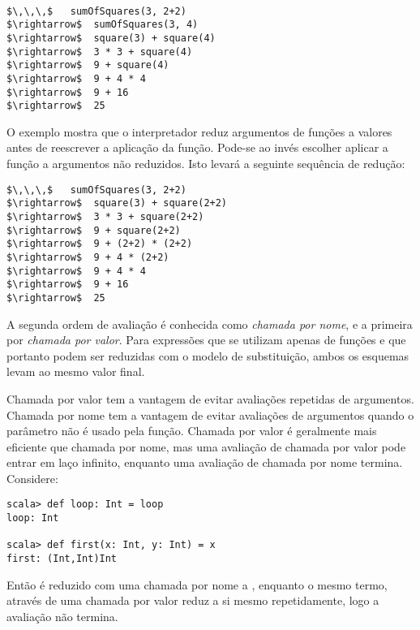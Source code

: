 \example\ 
 
\begin{lstlisting}
$\,\,\,$   sumOfSquares(3, 2+2)
$\rightarrow$  sumOfSquares(3, 4)
$\rightarrow$  square(3) + square(4)
$\rightarrow$  3 * 3 + square(4)
$\rightarrow$  9 + square(4)
$\rightarrow$  9 + 4 * 4
$\rightarrow$  9 + 16
$\rightarrow$  25
\end{lstlisting}

O exemplo mostra que o interpretador reduz argumentos de fun\c{c}\~{o}es a valores 
antes de reescrever a aplica\c{c}\~{a}o da fun\c{c}\~{a}o. Pode-se ao inv\'{e}s escolher aplicar
a fun\c{c}\~{a}o a argumentos n\~{a}o reduzidos. Isto levar\'{a} a seguinte sequ\^{e}ncia de 
redu\c{c}\~{a}o: 

\begin{lstlisting}
$\,\,\,$   sumOfSquares(3, 2+2)
$\rightarrow$  square(3) + square(2+2)
$\rightarrow$  3 * 3 + square(2+2)
$\rightarrow$  9 + square(2+2)
$\rightarrow$  9 + (2+2) * (2+2)
$\rightarrow$  9 + 4 * (2+2)
$\rightarrow$  9 + 4 * 4
$\rightarrow$  9 + 16
$\rightarrow$  25
\end{lstlisting}

A segunda ordem de avalia\c{c}\~{a}o \'{e} conhecida como \emph{chamada por nome},
e a primeira por \emph{chamada por valor}. Para express\~{o}es que se utilizam
apenas de fun\c{c}\~{o}es e que portanto podem ser reduzidas com o modelo de 
substitui\c{c}\~{a}o, ambos os esquemas levam ao mesmo valor final.

Chamada por valor tem a vantagem de evitar avalia\c{c}\~{o}es repetidas de argumentos.
Chamada por nome tem a vantagem de evitar avalia\c{c}\~{o}es de argumentos quando o 
par\^{a}metro n\~{a}o \'{e} usado pela fun\c{c}\~{a}o. Chamada por valor \'{e} geralmente mais 
eficiente que chamada por nome, mas uma avalia\c{c}\~{a}o de chamada por valor
pode entrar em la\c{c}o infinito, enquanto uma avalia\c{c}\~{a}o de chamada por nome 
termina. Considere: 

\begin{lstlisting}
scala> def loop: Int = loop
loop: Int

scala> def first(x: Int, y: Int) = x
first: (Int,Int)Int
\end{lstlisting}

Ent\~{a}o  \'{e} reduzido com uma chamada por nome a ,
enquanto o mesmo termo, atrav\'{e}s de uma chamada por valor reduz a si mesmo 
repetidamente, logo a avalia\c{c}\~{a}o n\~{a}o termina.  

